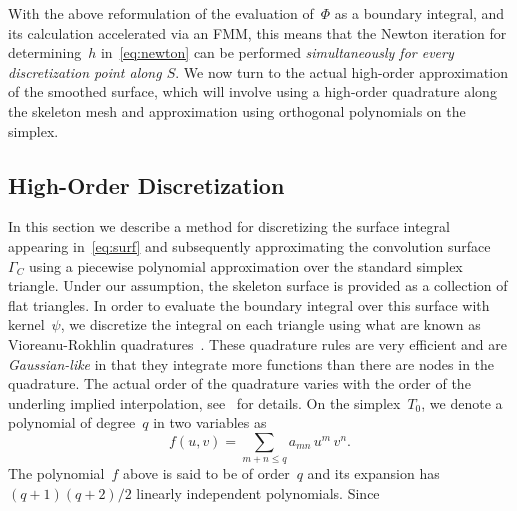 \documentclass[11pt]{article}
\numberwithin{equation}{section}
\newcommand{\vct}{\vectorsym}
\DeclareMathOperator\erf{Erf}
\newcommand\bx{\vct{x}}
\newcommand\by{\vct{y}}
\newcommand\bn{\boldsymbol n}
\begin{document}


With the above reformulation of the evaluation of~$\Phi$ as a boundary
integral, and its calculation accelerated via an FMM, this means that
the Newton iteration for determining~$h$ in~\eqref{eq:newton} can be
performed \emph{simultaneously for every discretization point along
  $S$}. We now turn to the actual high-order approximation of the
smoothed surface, which will involve using a high-order quadrature
along the skeleton mesh and approximation using orthogonal polynomials
on the simplex.




\subsection{High-Order Discretization}
\label{sec:disc}

In this section we describe a method for discretizing the surface
integral appearing in~\eqref{eq:surf} and subsequently approximating
the convolution surface~$\Gamma_C$ using a piecewise polynomial
approximation over the standard simplex triangle. Under our
assumption, the skeleton surface is provided as a collection of flat
triangles. In order to evaluate the boundary integral over this
surface with kernel~$\psi$, we discretize the integral on each
triangle using what are known as Vioreanu-Rokhlin
quadratures~\cite{vioreanu_2014}. These quadrature rules are very
efficient and are \emph{Gaussian-like} in that they integrate more
functions than there are nodes in the quadrature. The actual order of
the quadrature varies with the order of the underling implied
interpolation, see~\cite{vioreanu_2014} for details.
On the simplex~$T_0$, we
denote a polynomial of degree~$q$ in two variables as
\begin{equation}
  f(u,v) = \sum_{m+n \leq q} a_{mn} \, u^m \, v^n.
\end{equation}
The polynomial~$f$ above is said to be of order~$q$ and its expansion
has~$(q+1)(q+2)/2$ linearly independent polynomials. Since 
\end{document}
